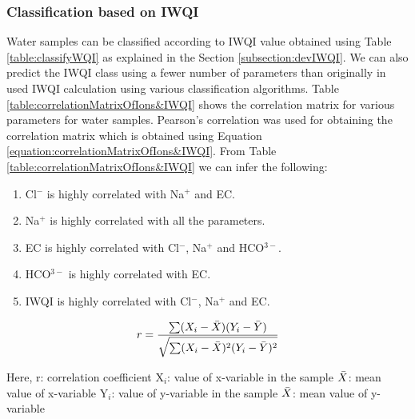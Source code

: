 \subsubsection{Classification based on IWQI}
\label{subsubsection:classificationBasedOnIWQI}
Water samples can be classified according to IWQI value obtained using Table \ref{table:classifyWQI} as explained in the Section \ref{subsection:devIWQI}. We can also predict the IWQI class using a fewer number of parameters than originally in used IWQI calculation using various classification algorithms. Table \ref{table:correlationMatrixOfIons&IWQI} shows the correlation matrix for various parameters for water samples. Pearson’s correlation was used for obtaining the correlation matrix which is obtained using Equation \ref{equation:correlationMatrixOfIons&IWQI}. From Table \ref{table:correlationMatrixOfIons&IWQI} we can infer the following:
\begin{enumerate}
    \item Cl$^-$ is highly correlated with Na$^+$ and EC.
    \item Na$^+$ is highly correlated with all the parameters.
    \item EC is highly correlated with Cl$^-$, Na$^+$ and HCO$^{3-}$.
    \item HCO$^{3-}$ is highly correlated with EC.
    \item IWQI is highly correlated with Cl$^-$, Na$^+$ and EC.
\end{enumerate}

\begin{equation}
    r = \frac{\sum(X_i - \Bar{X})(Y_i - \Bar{Y})}{\sqrt{\sum(X_i - \Bar{X})^2(Y_i - \Bar{Y})^2}}
\label{equation:correlationMatrixOfIons&IWQI}
\end{equation}

Here, \newline
r: correlation coefficient \newline
X$_i$: value of x-variable in the sample \newline
$\Bar{X}$: mean value of x-variable \newline
Y$_i$: value of y-variable in the sample \newline
$\Bar{X}$: mean value of y-variable


